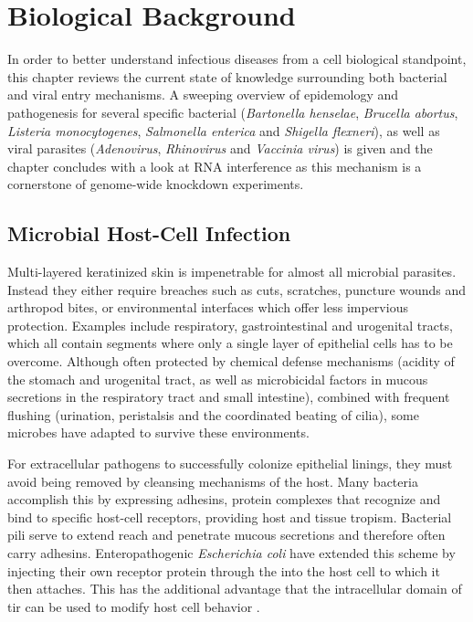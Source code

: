 \chapter{Biological Background}

In order to better understand infectious diseases from a cell biological standpoint, this chapter reviews the current state of knowledge surrounding both bacterial and viral entry mechanisms. A sweeping overview of epidemology and pathogenesis for several specific bacterial (\textit{Bartonella henselae}, \textit{Brucella abortus}, \textit{Listeria monocytogenes}, \textit{Salmonella enterica} and \textit{Shigella flexneri}), as well as viral parasites (\textit{Adenovirus}, \textit{Rhinovirus} and \textit{Vaccinia virus}) is given and the chapter concludes with a look at RNA interference as this mechanism is a cornerstone of genome-wide knockdown experiments.

\section{Microbial Host-Cell Infection}

Multi-layered keratinized skin is impenetrable for almost all microbial parasites. Instead they either require breaches such as cuts, scratches, puncture wounds and arthropod bites, or environmental interfaces which offer less impervious protection. Examples include respiratory, gastrointestinal and urogenital tracts, which all contain segments where only a single layer of epithelial cells has to be overcome. Although often protected by chemical defense mechanisms (acidity of the stomach and urogenital tract, as well as microbicidal factors in mucous secretions in the respiratory tract and small intestine), combined with frequent flushing (urination, peristalsis and the coordinated beating of cilia), some microbes have adapted to survive these environments.


For extracellular pathogens to successfully colonize epithelial linings, they must avoid being removed by cleansing mechanisms of the host. Many bacteria accomplish this by expressing adhesins, protein complexes that recognize and bind to specific host-cell receptors, providing host and tissue tropism. Bacterial pili serve to extend reach and penetrate mucous secretions and therefore often carry adhesins. Enteropathogenic \textit{Escherichia coli} have extended this scheme by injecting their own receptor protein  through the  into the host cell to which it then attaches. This has the additional advantage that the intracellular domain of \gls{tir} can be used to modify host cell behavior \citep{Alberts2008}.

